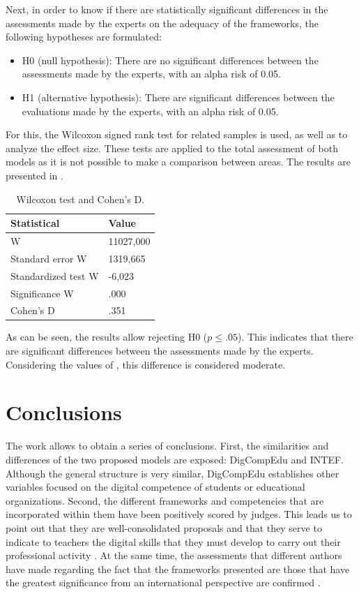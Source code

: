 \documentclass{textolivre}
\begin{document}
Next, in order to know if there are statistically significant differences in
the assessments made by the experts on the adequacy of the frameworks, the
following hypotheses are formulated:
\begin{itemize}
\item H0 (null hypothesis): There are no significant differences between the
assessments made by the experts, with an alpha risk of 0.05.
\item H1 (alternative hypothesis): There are significant differences between
the evaluations made by the experts, with an alpha risk of 0.05.
\end{itemize}

For this, the Wilcoxon signed rank test for related samples \cite{siegel1976} is
used, as well as \textcite{cohen2013statistical} to analyze the effect size. These tests are
applied to the total assessment of both models as it is not possible to make a
comparison between areas. The results are presented in .

\begin{table}[htpb]
\caption{Wilcoxon test and Cohen's D.}
\label{tab04}
\centering
\begin{tabular}{ll}
\toprule 
Statistical & Value \\
\midrule
W & 11027,000 \\
Standard error W & 1319,665 \\
Standardized test W & -6,023 \\
Significance W & .000 \\
Cohen's D & .351 \\
\bottomrule
\end{tabular}
\end{table}

As can be seen, the results allow rejecting H0 ($p \leq .05$). This indicates
that there are significant differences between the assessments made by the
experts. Considering the values of \textcite{cohen2013statistical}, this difference is considered
moderate.


\section{Conclusions}\label{sec-concl}
The work allows to obtain a series of conclusions. First, the similarities and
differences of the two proposed models are exposed: DigCompEdu and INTEF.
Although the general structure is very similar, DigCompEdu establishes other
variables focused on the digital competence of students or educational
organizations. Second, the different frameworks and competencies that are
incorporated within them have been positively scored by judges. This leads us
to point out that they are well-consolidated proposals and that they serve to
indicate to teachers the digital skills that they must develop to carry out
their professional activity \cite{falloon2020}. At the same time, the assessments
that different authors have made regarding the fact that the frameworks
presented are those that have the greatest significance from an international
perspective are confirmed \cite{prendesEspinosa2011,duranCuartero2019,caberoAlmenara2019a,lazaroCantabrana2019,rodrguezGarca2019,silva2019,caberoAlmenara2019b,ruizCabezas2020}.
\end{document}
